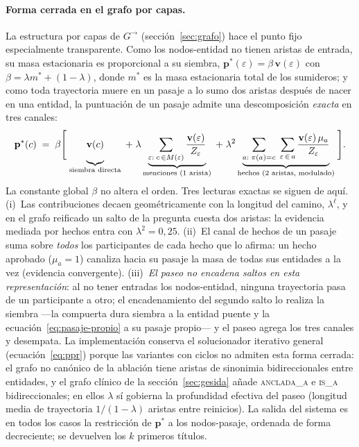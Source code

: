 \documentclass[11pt,a4paper]{article}
\begin{document}
\paragraph{Forma cerrada en el grafo por capas.}
La estructura por capas de $G^{\!\rightarrow}$ (sección~\ref{sec:grafo})
hace el punto fijo especialmente transparente. Como los nodos-entidad no
tienen aristas de entrada, su masa estacionaria es proporcional a su
siembra, $\mathbf{p}^{*}(\varepsilon) = \beta\,\mathbf{v}(\varepsilon)$
con $\beta = \lambda m^{*} + (1-\lambda)$, donde $m^{*}$ es la masa
estacionaria total de los sumideros; y como toda trayectoria muere en un
pasaje a lo sumo dos aristas después de nacer en una entidad, la
puntuación de un pasaje admite una descomposición \emph{exacta} en tres
canales:
\begin{equation}
\mathbf{p}^{*}(c) \;=\; \beta\Biggl[\;
\underbrace{\mathbf{v}(c)\vphantom{\sum_{\varepsilon}}}_{\text{siembra directa}}
\;+\;
\lambda \underbrace{\sum_{\varepsilon:\; c\,\in M(\varepsilon)}
\frac{\mathbf{v}(\varepsilon)}{Z_\varepsilon}}_{\text{menciones (1 arista)}}
\;+\;
\lambda^{2} \underbrace{\sum_{a:\;\pi(a)=c}\;
\sum_{\varepsilon\,\in\, a}
\frac{\mathbf{v}(\varepsilon)\,\mu_a}{Z_\varepsilon}}_{\text{hechos (2 aristas, modulado)}}
\;\Biggr].
\label{eq:tres-canales}
\end{equation}
La constante global $\beta$ no altera el orden. Tres lecturas exactas se
siguen de aquí. (i)~Las contribuciones decaen geométricamente con la
longitud del camino, $\lambda^{\ell}$, y en el grafo reificado un
\guillemotleft{}salto\guillemotright{} de la pregunta cuesta dos aristas: la evidencia mediada por
hechos entra con $\lambda^{2}=0{,}25$. (ii)~El canal de hechos de un pasaje
suma sobre \emph{todos} los participantes de cada hecho que lo afirma: un
hecho aprobado ($\mu_a=1$) canaliza hacia su pasaje la masa de todas sus
entidades a la vez (evidencia convergente). (iii)~\emph{El paseo no
encadena saltos en esta representación}: al no tener entradas los
nodos-entidad, ninguna trayectoria pasa de un participante a otro; el
encadenamiento del segundo salto lo realiza la siembra ---la compuerta
dura siembra a la entidad puente y la ecuación~\ref{eq:pasaje-propio} a su
pasaje propio--- y el paseo agrega los tres canales y desempata. La
implementación conserva el solucionador iterativo general
(ecuación~\ref{eq:ppr}) porque las variantes con ciclos no admiten esta
forma cerrada: el grafo no canónico de la ablación tiene aristas de
sinonimia bidireccionales entre entidades, y el grafo clínico de la
sección~\ref{sec:gesida} añade \textsc{anclada\_a} e \textsc{is\_a}
bidireccionales; en ellos $\lambda$ sí gobierna la profundidad efectiva
del paseo (longitud media de trayectoria $1/(1-\lambda)$ aristas entre
reinicios). La salida del sistema es en todos los casos la restricción de
$\mathbf{p}^{*}$ a los nodos-pasaje, ordenada de forma decreciente; se
devuelven los $k$ primeros títulos.
\end{document}
